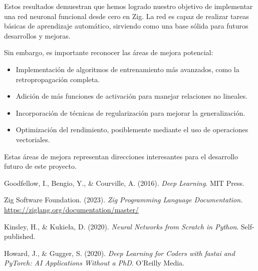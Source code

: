 \documentclass[twocolumn]{article}
\begin{document}
Estos resultados demuestran que hemos logrado nuestro objetivo de implementar una red neuronal funcional desde cero en Zig. La red es capaz de realizar tareas básicas de aprendizaje automático, sirviendo como una base sólida para futuros desarrollos y mejoras.

Sin embargo, es importante reconocer las áreas de mejora potencial:
\begin{itemize}
    \item Implementación de algoritmos de entrenamiento más avanzados, como la retropropagación completa.
    \item Adición de más funciones de activación para manejar relaciones no lineales.
    \item Incorporación de técnicas de regularización para mejorar la generalización.
    \item Optimización del rendimiento, posiblemente mediante el uso de operaciones vectoriales.
\end{itemize}

Estas áreas de mejora representan direcciones interesantes para el desarrollo futuro de este proyecto.

\begin{thebibliography}{9}
Goodfellow, I., Bengio, Y., \& Courville, A. (2016). 
\textit{Deep Learning}. 
MIT Press.

Zig Software Foundation. (2023).
\textit{Zig Programming Language Documentation}.
\url{https://ziglang.org/documentation/master/}

Kinsley, H., \& Kukieła, D. (2020).
\textit{Neural Networks from Scratch in Python}.
Self-published.

Howard, J., \& Gugger, S. (2020).
\textit{Deep Learning for Coders with fastai and PyTorch: AI Applications Without a PhD}.
O'Reilly Media.
\end{thebibliography}
\end{document}
